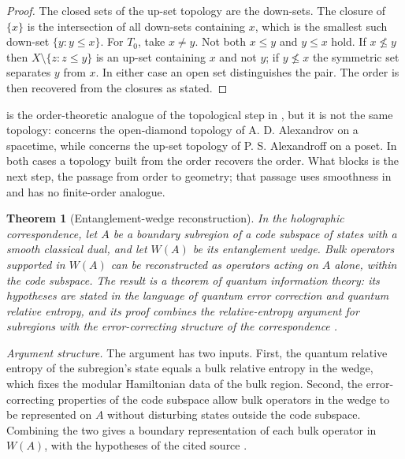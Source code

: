 \documentclass[11pt,letterpaper]{article}
\newtheorem{theorem}{Theorem}[section]
\theoremstyle{definition}
\theoremstyle{remark}
\begin{document}
\begin{proof}
The closed sets of the up-set topology are the down-sets. The closure of $\{x\}$ is the intersection of all down-sets containing $x$, which is the smallest such down-set $\{y : y \le x\}$. For $T_0$, take $x \ne y$. Not both $x \le y$ and $y \le x$ hold. If $x \not\le y$ then $X \setminus \{z : z \le y\}$ is an up-set containing $x$ and not $y$; if $y \not\le x$ the symmetric set separates $y$ from $x$. In either case an open set distinguishes the pair. The order is then recovered from the closures as stated.
\end{proof}

 is the order-theoretic analogue of the topological step in , but it is not the same topology:  concerns the open-diamond topology of A. D. Alexandrov on a spacetime, while  concerns the up-set topology of P. S. Alexandroff on a poset. In both cases a topology built from the order recovers the order. What  blocks is the next step, the passage from order to geometry; that passage uses smoothness in  and has no finite-order analogue.

\begin{theorem}[Entanglement-wedge reconstruction]\label{thm:dhw}
In the holographic correspondence, let $A$ be a boundary subregion of a code subspace of states with a smooth classical dual, and let $W(A)$ be its entanglement wedge. Bulk operators supported in $W(A)$ can be reconstructed as operators acting on $A$ alone, within the code subspace. The result is a theorem of quantum information theory: its hypotheses are stated in the language of quantum error correction and quantum relative entropy, and its proof combines the relative-entropy argument for subregions with the error-correcting structure of the correspondence \cite{dongharlowwall}.
\end{theorem}

\par\medskip\noindent\emph{Argument structure.}
The argument has two inputs. First, the quantum relative entropy of the subregion's state equals a bulk relative entropy in the wedge, which fixes the modular Hamiltonian data of the bulk region. Second, the error-correcting properties of the code subspace allow bulk operators in the wedge to be represented on $A$ without disturbing states outside the code subspace. Combining the two gives a boundary representation of each bulk operator in $W(A)$, with the hypotheses of the cited source \cite{dongharlowwall}.
\par\medskip
\end{document}
